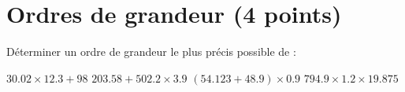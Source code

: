 \section{Ordres de grandeur (4 points)}

Déterminer un ordre de grandeur le plus précis possible de :

\begin{questions}
	\question[1] $\num{30.02} \times \num{12.3} + 98$
	\question[1] $\num{203.58} + \num{502.2} \times \num{3.9}$
	\question[1] $(\num{54.123} + \num{48.9}) \times \num{0.9}$
	\question[1] $\num{794.9} \times \num{1.2} \times \num{19.875}$
\end{questions}